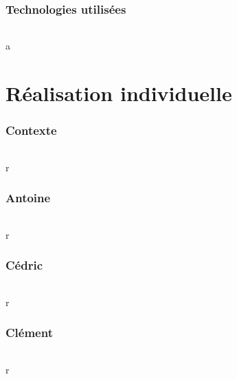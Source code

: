 \documentclass[titlepage, 13px, a4paper]{report}
\begin{document}
\section{Technologies utilisées}
\paragraph{} \hspace{0pt}
a


\newpage


\part{Réalisation individuelle}
\section*{Contexte}
\paragraph{} \hspace{0pt}
r

\newpage
\section{Antoine}
\paragraph{} \hspace{0pt}
r

\newpage
\section{Cédric}
\paragraph{} \hspace{0pt}
r

\newpage
\section{Clément}
\paragraph{} \hspace{0pt}
r
\end{document}
